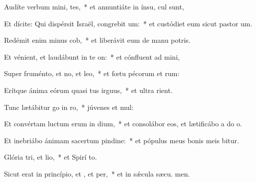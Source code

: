 \item Audíte verbum mini, tes,~* et annuntiáte in ínsu,  cul sunt,
\item Et dícite: Qui dispérsit Israël, congrebit um:~* et custódiet eum sicut pastor  um.
\item Redémit enim minus cob,~* et liberávit eum de manu potris.
\item Et vénient, et laudábunt in te on:~* et cónfluent ad  mini,
\item Super fruménto, et no, et leo,~* et fœtu pécorum et rum:
\item Erítque ánima eórum quasi tus irguus,~* et ultra  rient.
\item Tunc lætábitur go in ro,~* júvenes et  mul:
\item Et convértam luctum erum in dium,~* et consolábor eos, et lætificábo a do o.
\item Et inebriábo ánimam sacertum pindine:~* et pópulus meus bonis meis bitur.
\item Glória tri, et lio,~* et Spirí to.
\item Sicut erat in princípio, et , et per,~* et in sǽcula sæcu. men.
